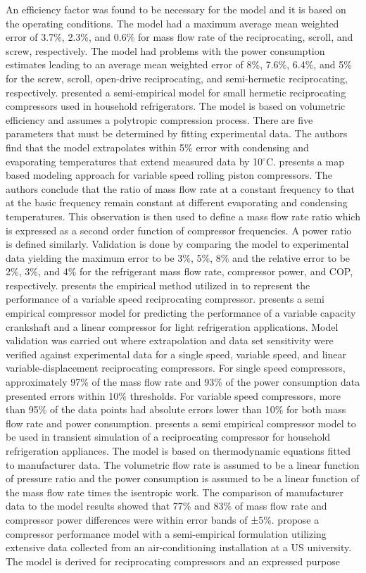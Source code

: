 \documentclass[preprint,11pt,authoryear]{elsarticle}
\begin{document}
An efficiency factor was found to be necessary for the model and it is based on the operating conditions. The model had a maximum average mean weighted error of 3.7\%, 2.3\%, and 0.6\% for mass flow rate of the reciprocating, scroll, and screw, respectively. The model had problems with the power consumption estimates leading to an average mean weighted error of 8\%, 7.6\%, 6.4\%, and 5\% for the screw, scroll, open-drive reciprocating, and semi-hermetic reciprocating, respectively. \cite{Jahnig2000} presented a semi-empirical model for small hermetic reciprocating compressors used in household refrigerators. The model is based on volumetric efficiency and assumes a polytropic compression process. There are five parameters that must be determined by fitting experimental data. The authors find that the model extrapolates within 5\% error with condensing and evaporating temperatures that extend measured data by 10$^{\circ}$C. \cite{Shao2004a} presents a map based modeling approach for variable speed rolling piston compressors. The authors conclude that the ratio of mass flow rate at a constant frequency to that at the basic frequency remain constant at different evaporating and condensing temperatures. This observation is then used to define a mass flow rate ratio which is expressed as a second order function of compressor frequencies. A power ratio is defined similarly. Validation is done by comparing the model to experimental data yielding the maximum error to be 3\%, 5\%, 8\% and the relative error to be 2\%, 3\%, and 4\% for the refrigerant mass flow rate, compressor power, and COP, respectively. \cite{Aprea2008} presents the empirical method utilized in \cite{Shao2004a} to represent the performance of a variable speed reciprocating compressor. \cite{Santos2019} presents a semi empirical compressor model for predicting the performance of a variable capacity crankshaft and a linear compressor for light refrigeration applications. Model validation was carried out where extrapolation and data set sensitivity were verified against experimental data for a single speed, variable speed, and linear variable-displacement reciprocating compressors. For single speed compressors, approximately 97\% of the mass flow rate and 93\% of the power consumption data presented errors within 10\% thresholds. For variable speed compressors, more than 95\% of the data points had absolute errors lower than 10\% for both mass flow rate and power consumption. \cite{Negrao2011} presents a semi empirical compressor model to be used in transient simulation of a reciprocating compressor for household refrigeration appliances. The model is based on thermodynamic equations fitted to manufacturer data. The volumetric flow rate is assumed to be a linear function of pressure ratio and the power consumption is assumed to be a linear function of the mass flow rate times the isentropic work. The comparison of manufacturer data to the model results showed that 77\% and 83\% of mass flow rate and compressor power differences were within error bands of ±5\%. \cite{Popovic1995a} propose a compressor performance model with a semi-empirical formulation utilizing extensive data collected from an air-conditioning installation at a US university. The model is derived for reciprocating compressors and an expressed purpose 
\end{document}
